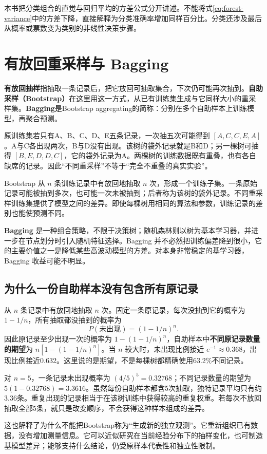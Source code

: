 本书把分类组合的直觉与回归平均的方差公式分开讲述。不能将式\eqref{eq:forest-variance}中的方差下降，直接解释为分类准确率增加同样百分比。分类还涉及最后从概率或票数变为类别的非线性决策步骤。

\section{有放回重采样与 Bagging}

\textbf{有放回抽样}指抽取一条记录后，把它放回可抽取集合，下次仍可能再次抽到。\textbf{自助采样（Bootstrap）}在这里用这一方式，从已有训练集生成与它同样大小的重采样集。\textbf{Bagging}是Bootstrap aggregating的简称：分别在多个自助样本上训练模型，再聚合预测。

原训练集若只有A、B、C、D、E五条记录，一次抽五次可能得到 $[A,C,C,E,A]$。A与C各出现两次，B与D没有出现。该树的袋外记录就是B和D；另一棵树可抽得 $[B,E,D,D,C]$，它的袋外记录为A。两棵树的训练数据既有重叠，也有各自缺席的记录。因此“不同重采样”不等于“完全不重叠的真实实验”。

Bootstrap 从 $n$ 条训练记录中有放回地抽取 $n$ 次，形成一个训练子集。一条原始记录可能被抽到多次，也可能一次未被抽到；后者称为该树的袋外记录。不同重采样训练集提供了模型之间的差异。即使每棵树用相同的算法和参数，训练记录的差别也能使预测不同。

\textbf{Bagging} 是一种组合策略，不限于决策树；随机森林则以树为基本学习器，并进一步在节点划分时引入随机特征选择。Bagging 并不必然把训练偏差降到很小，它的主要价值之一是降低某些高波动模型的方差。对本身非常稳定的基学习器，Bagging 收益可能不明显。

\subsection{为什么一份自助样本没有包含所有原记录}
从 $n$ 条记录中有放回地抽取 $n$ 次。固定一条原记录，每次没抽到它的概率为 $1-1/n$，所有抽取都没抽到的概率为
\[
P(\text{未出现})=(1-1/n)^n.
\]
因此原记录至少出现一次的概率为 $1-(1-1/n)^n$，自助样本中\textbf{不同原记录数量的期望}为 $n[1-(1-1/n)^n]$。当 $n$ 较大时，未出现比例接近 $e^{-1}\approx0.368$，出现比例接近0.632。这里说的是期望，不是每棵树都精确使用63.2\%不同记录。

对 $n=5$，一条记录未出现概率为 $(4/5)^5=0.32768$；不同记录数量的期望为 $5(1-0.32768)=3.3616$。虽然每份自助样本都含5次抽取，独特记录平均只有约3.36条。重复出现的记录相当于在该树训练中获得较高的重复权重。若每次不放回抽取全部5条，就只是改变顺序，不会获得这种样本组成的差异。

这也解释了为什么不能把Bootstrap称为“生成新的独立观测”。它重新组织已有数据，没有增加测量信息。它可以近似研究在当前经验分布下的抽样变化，也可制造基模型差异；能够支持什么结论，仍受原样本代表性和独立性限制。

